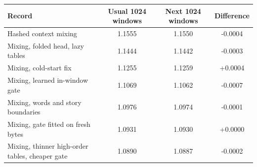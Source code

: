 \begin{tabular}{lccc}
\toprule
Record & Usual 1024 windows & Next 1024 windows & Difference \\
\midrule
Hashed context mixing & 1.1555 & 1.1550 & -0.0004 \\
Mixing, folded head, lazy tables & 1.1444 & 1.1442 & -0.0003 \\
Mixing, cold-start fix & 1.1255 & 1.1259 & +0.0004 \\
Mixing, learned in-window gate & 1.1069 & 1.1062 & -0.0007 \\
Mixing, words and story boundaries & 1.0976 & 1.0974 & -0.0001 \\
Mixing, gate fitted on fresh bytes & 1.0931 & 1.0930 & +0.0000 \\
Mixing, thinner high-order tables, cheaper gate & 1.0890 & 1.0887 & -0.0002 \\
\bottomrule
\end{tabular}
